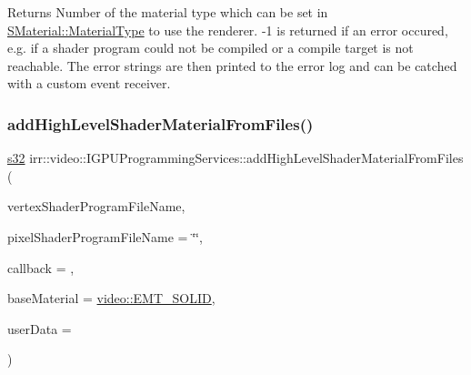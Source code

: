 \begin{DoxyReturn}{Returns}
Number of the material type which can be set in \hyperlink{classirr_1_1video_1_1SMaterial_a8cb63ab4b49ae1c61fbca8353e6b2f8a}{S\+Material\+::\+Material\+Type} to use the renderer. -\/1 is returned if an error occured, e.\+g. if a shader program could not be compiled or a compile target is not reachable. The error strings are then printed to the error log and can be catched with a custom event receiver. 
\end{DoxyReturn}
\mbox{\label{classirr_1_1video_1_1IGPUProgrammingServices_a6ad72d2498a05669231531d54d849655}} 
\subsubsection{\texorpdfstring{add\+High\+Level\+Shader\+Material\+From\+Files()}{addHighLevelShaderMaterialFromFiles()}\hspace{0.1cm}{\footnotesize\ttfamily [2/4]}}
{\footnotesize\ttfamily \hyperlink{namespaceirr_ac66849b7a6ed16e30ebede579f9b47c6}{s32} irr\+::video\+::\+I\+G\+P\+U\+Programming\+Services\+::add\+High\+Level\+Shader\+Material\+From\+Files (\begin{DoxyParamCaption}\item[{const \hyperlink{namespaceirr_1_1io_ab1bdc45edb3f94d8319c02bc0f840ee1}{io\+::path} \&}]{vertex\+Shader\+Program\+File\+Name,  }\item[{const \hyperlink{namespaceirr_1_1io_ab1bdc45edb3f94d8319c02bc0f840ee1}{io\+::path} \&}]{pixel\+Shader\+Program\+File\+Name = {\ttfamily \char`\"{}\char`\"{}},  }\item[{\hyperlink{classirr_1_1video_1_1IShaderConstantSetCallBack}{I\+Shader\+Constant\+Set\+Call\+Back} $\ast$}]{callback = {},  }\item[{\hyperlink{namespaceirr_1_1video_ac8e9b6c66f7cebabd1a6d30cbc5430f1}{E\+\_\+\+M\+A\+T\+E\+R\+I\+A\+L\+\_\+\+T\+Y\+PE}}]{base\+Material = {\ttfamily \hyperlink{namespaceirr_1_1video_ac8e9b6c66f7cebabd1a6d30cbc5430f1a9bc471b9c18c9e2d20496004d2a2e803}{video\+::\+E\+M\+T\+\_\+\+S\+O\+L\+ID}},  }\item[{\hyperlink{namespaceirr_ac66849b7a6ed16e30ebede579f9b47c6}{s32}}]{user\+Data = {} }\end{DoxyParamCaption})\hspace{0.3cm}{\ttfamily [inline]}}



